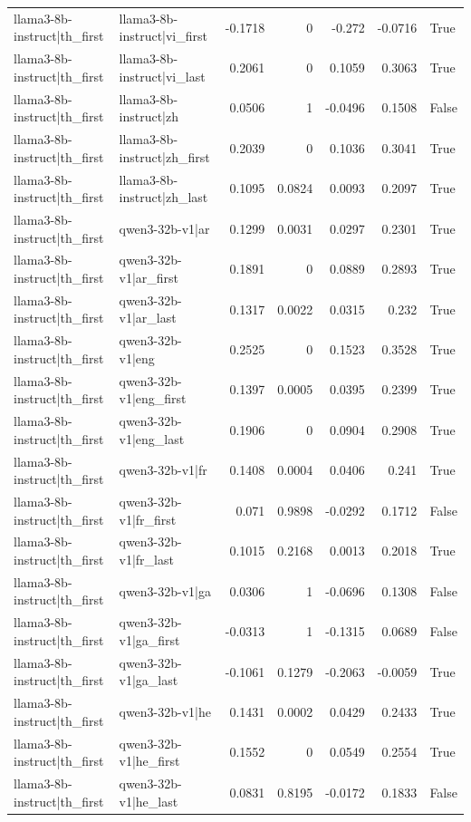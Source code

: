 \begin{table}
\begin{tabular}{l l r r r r l}
llama3-8b-instruct|th_first & llama3-8b-instruct|vi_first & -0.1718 & 0 & -0.272 & -0.0716 & True \\
llama3-8b-instruct|th_first & llama3-8b-instruct|vi_last & 0.2061 & 0 & 0.1059 & 0.3063 & True \\
llama3-8b-instruct|th_first & llama3-8b-instruct|zh & 0.0506 & 1 & -0.0496 & 0.1508 & False \\
llama3-8b-instruct|th_first & llama3-8b-instruct|zh_first & 0.2039 & 0 & 0.1036 & 0.3041 & True \\
llama3-8b-instruct|th_first & llama3-8b-instruct|zh_last & 0.1095 & 0.0824 & 0.0093 & 0.2097 & True \\
llama3-8b-instruct|th_first & qwen3-32b-v1|ar & 0.1299 & 0.0031 & 0.0297 & 0.2301 & True \\
llama3-8b-instruct|th_first & qwen3-32b-v1|ar_first & 0.1891 & 0 & 0.0889 & 0.2893 & True \\
llama3-8b-instruct|th_first & qwen3-32b-v1|ar_last & 0.1317 & 0.0022 & 0.0315 & 0.232 & True \\
llama3-8b-instruct|th_first & qwen3-32b-v1|eng & 0.2525 & 0 & 0.1523 & 0.3528 & True \\
llama3-8b-instruct|th_first & qwen3-32b-v1|eng_first & 0.1397 & 0.0005 & 0.0395 & 0.2399 & True \\
llama3-8b-instruct|th_first & qwen3-32b-v1|eng_last & 0.1906 & 0 & 0.0904 & 0.2908 & True \\
llama3-8b-instruct|th_first & qwen3-32b-v1|fr & 0.1408 & 0.0004 & 0.0406 & 0.241 & True \\
llama3-8b-instruct|th_first & qwen3-32b-v1|fr_first & 0.071 & 0.9898 & -0.0292 & 0.1712 & False \\
llama3-8b-instruct|th_first & qwen3-32b-v1|fr_last & 0.1015 & 0.2168 & 0.0013 & 0.2018 & True \\
llama3-8b-instruct|th_first & qwen3-32b-v1|ga & 0.0306 & 1 & -0.0696 & 0.1308 & False \\
llama3-8b-instruct|th_first & qwen3-32b-v1|ga_first & -0.0313 & 1 & -0.1315 & 0.0689 & False \\
llama3-8b-instruct|th_first & qwen3-32b-v1|ga_last & -0.1061 & 0.1279 & -0.2063 & -0.0059 & True \\
llama3-8b-instruct|th_first & qwen3-32b-v1|he & 0.1431 & 0.0002 & 0.0429 & 0.2433 & True \\
llama3-8b-instruct|th_first & qwen3-32b-v1|he_first & 0.1552 & 0 & 0.0549 & 0.2554 & True \\
llama3-8b-instruct|th_first & qwen3-32b-v1|he_last & 0.0831 & 0.8195 & -0.0172 & 0.1833 & False \\

\end{tabular}
\end{table}
